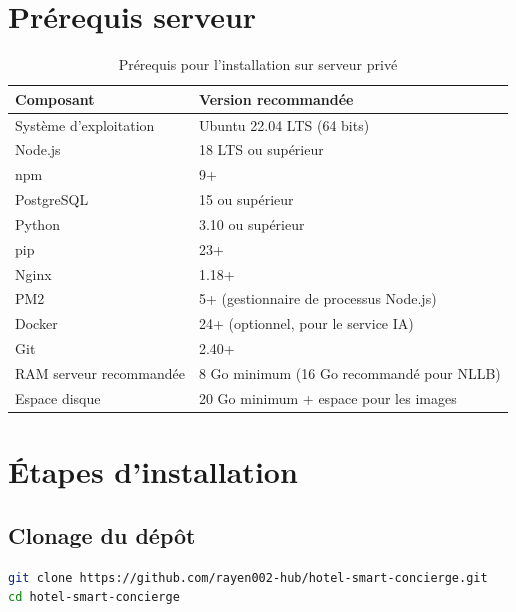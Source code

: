 \section{Prérequis serveur}
\label{sec:prerequis_serveur}

\begin{table}[H]
\centering
\caption{Prérequis pour l'installation sur serveur privé}
\label{tab:prerequis}
\begin{tabular}{|l|l|}
\hline
\textbf{Composant} & \textbf{Version recommandée} \\
\hline
Système d'exploitation & Ubuntu 22.04 LTS (64 bits) \\
\hline
Node.js & 18 LTS ou supérieur \\
\hline
npm & 9+ \\
\hline
PostgreSQL & 15 ou supérieur \\
\hline
Python & 3.10 ou supérieur \\
\hline
pip & 23+ \\
\hline
Nginx & 1.18+ \\
\hline
PM2 & 5+ (gestionnaire de processus Node.js) \\
\hline
Docker & 24+ (optionnel, pour le service IA) \\
\hline
Git & 2.40+ \\
\hline
RAM serveur recommandée & 8 Go minimum (16 Go recommandé pour NLLB) \\
\hline
Espace disque & 20 Go minimum + espace pour les images \\
\hline
\end{tabular}
\end{table}

\section{Étapes d'installation}
\label{sec:installation_serveur}

\subsection{Clonage du dépôt}

\begin{lstlisting}[language=bash, caption={Clonage du dépôt et configuration de l'environnement}]
git clone https://github.com/rayen002-hub/hotel-smart-concierge.git
cd hotel-smart-concierge
\end{lstlisting}

